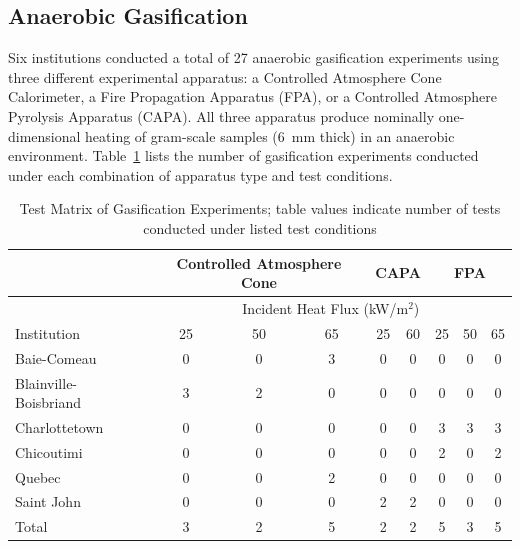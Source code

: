 \documentclass{book}
\begin{document}
\subsection{Anaerobic Gasification}

Six institutions conducted a total of 27 anaerobic gasification experiments using three different experimental apparatus: a Controlled Atmosphere Cone Calorimeter, a Fire Propagation Apparatus (FPA), or a Controlled Atmosphere Pyrolysis Apparatus (CAPA). All three apparatus produce nominally one-dimensional heating of gram-scale samples (6~mm thick) in an anaerobic environment. Table~\ref{Table_7} lists the number of gasification experiments conducted under each combination of apparatus type and test conditions.

\begin{table}[ht]
\caption{Test Matrix of Gasification Experiments; table values indicate number of tests conducted under listed test conditions}
\label{Table_7}
\begin{center}
\begin{tabular}{lcccccccc}
\hline
                         & \multicolumn{3}{c}{Controlled Atmosphere Cone} & \multicolumn{2}{c}{CAPA} & \multicolumn{3}{c}{FPA}     \\ \hline
                         & \multicolumn{8}{c}{Incident Heat Flux (kW/m$^2$)}                                                       \\ %
Institution              & 25 & 50 & 65 & 25 & 60 & 25 & 50 & 65                                                                   \\ \hline
Baie-Comeau              & 0  & 0  & 3  & 0  & 0  & 0  & 0  & 0                                                                    \\
Blainville-Boisbriand    & 3  & 2  & 0  & 0  & 0  & 0  & 0  & 0                                                                    \\
Charlottetown            & 0  & 0  & 0  & 0  & 0  & 3  & 3  & 3                                                                    \\
Chicoutimi               & 0  & 0  & 0  & 0  & 0  & 2  & 0  & 2                                                                    \\
Quebec                   & 0  & 0  & 2  & 0  & 0  & 0  & 0  & 0                                                                    \\
Saint John               & 0  & 0  & 0  & 2  & 2  & 0  & 0  & 0                                                                    \\ \hline
Total                    & 3  & 2  & 5  & 2  & 2  & 5  & 3  & 5                                                                    \\ \hline
\end{tabular}
\end{center}
\end{table}
\end{document}
